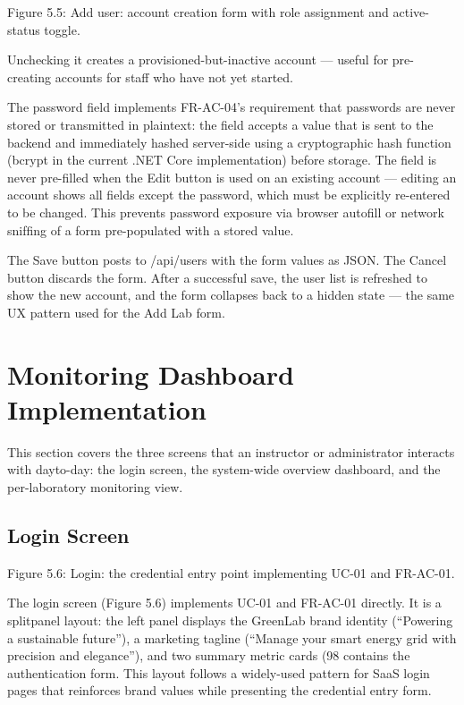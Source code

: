 Figure 5.5: Add user: account creation form with role assignment and active-status toggle.


Unchecking it creates a provisioned-but-inactive account --- useful for pre-creating accounts for staff who have not yet started.

The password ﬁeld implements FR-AC-04's requirement that passwords are never
stored or transmitted in plaintext: the ﬁeld accepts a value that is sent to the backend and
immediately hashed server-side using a cryptographic hash function (bcrypt in the current
.NET Core implementation) before storage. The ﬁeld is never pre-ﬁlled when the Edit
button is used on an existing account --- editing an account shows all ﬁelds except the password, which must be explicitly re-entered to be changed. This prevents password exposure
via browser autoﬁll or network snifﬁng of a form pre-populated with a stored value.

The Save button posts to /api/users with the form values as JSON. The Cancel
button discards the form. After a successful save, the user list is refreshed to show the new
account, and the form collapses back to a hidden state --- the same UX pattern used for the
Add Lab form.




\section{Monitoring Dashboard Implementation}


This section covers the three screens that an instructor or administrator interacts with dayto-day: the login screen, the system-wide overview dashboard, and the per-laboratory monitoring view.






\subsection{Login Screen}





Figure 5.6: Login: the credential entry point implementing UC-01 and FR-AC-01.


The login screen (Figure 5.6) implements UC-01 and FR-AC-01 directly. It is a splitpanel layout: the left panel displays the GreenLab brand identity (``Powering a sustainable future''), a marketing tagline (``Manage your smart energy grid with precision and elegance''), and two summary metric cards (98%
contains the authentication form. This layout follows a widely-used pattern for SaaS login
pages that reinforces brand values while presenting the credential entry form.

